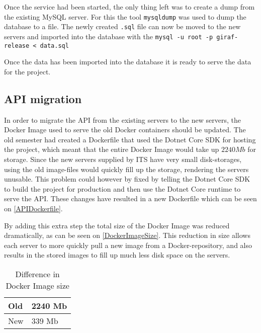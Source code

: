 Once the service had been started, the only thing left was to create a dump from the existing MySQL server. 
For this the tool \lstinline$mysqldump$ was used to dump the database to a file. 
The newly created \lstinline$.sql$ file can now be moved to the new servers and imported into the database with the \lstinline$mysql -u root -p giraf-release < data.sql$

Once the data has been imported into the database it is ready to serve the data for the project.

\subsection{API migration}
In order to migrate the API from the existing servers to the new servers, the Docker Image used to serve the old Docker containers should be updated. 
The old semester had created a Dockerfile that used the Dotnet Core SDK for hosting the project, which meant that the entire Docker Image would take up $2240 Mb$ for storage. 
Since the new servers supplied by ITS have very small disk-storages, using the old image-files would quickly fill up the storage, rendering the servers unusable.
This problem could however by fixed by telling the Dotnet Core SDK to build the project for production and then use the Dotnet Core runtime to serve the API. 
These changes have resulted in a new Dockerfile which can be seen on \autoref{APIDockerfile}. 

By adding this extra step the total size of the Docker Image was reduced dramatically, as can be seen on \autoref{DockerImageSize}. 
This reduction in size allows each server to more quickly pull a new image from a Docker-repository, and also results in the stored images to fill up much less disk space on the servers.

\begin{table}[H]
\centering
\begin{tabular}{|l|l|}
\hline
Old & 2240 Mb \\ \hline
New &  339 Mb  \\ \hline
\end{tabular}
\caption{Difference in Docker Image size}
\label{DockerImageSize}
\end{table}


